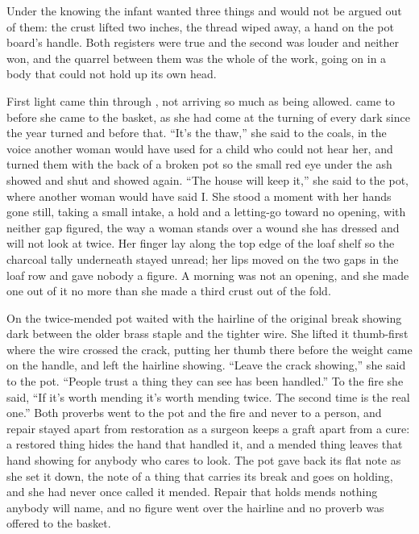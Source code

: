 Under the knowing the infant wanted three things and would not be argued out of them: the crust lifted two inches, the thread wiped away, a hand on the pot board's handle. Both registers were true and the second was louder and neither won, and the quarrel between them was the whole of the work, going on in a body that could not hold up its own head.

First light came thin through , not arriving so much as being allowed.  came to  before she came to the basket, as she had come at the turning of every dark since the year turned and before that. “It's the thaw,” she said to the coals, in the voice another woman would have used for a child who could not hear her, and turned them with the back of a broken pot so the small red eye under the ash showed and shut and showed again. “The house will keep it,” she said to the pot, where another woman would have said I. She stood a moment with her hands gone still, taking a small intake, a hold and a letting-go toward no opening, with neither gap figured, the way a woman stands over a wound she has dressed and will not look at twice. Her finger lay along the top edge of the loaf shelf so the charcoal tally underneath stayed unread; her lips moved on the two gaps in the loaf row and gave nobody a figure. A morning was not an opening, and she made one out of it no more than she made a third crust out of the fold.

On  the twice-mended pot waited with the hairline of the original break showing dark between the older brass staple and the tighter wire. She lifted it thumb-first where the wire crossed the crack, putting her thumb there before the weight came on the handle, and left the hairline showing. “Leave the crack showing,” she said to the pot. “People trust a thing they can see has been handled.” To the fire she said, “If it's worth mending it's worth mending twice. The second time is the real one.” Both proverbs went to the pot and the fire and never to a person, and repair stayed apart from restoration as a surgeon keeps a graft apart from a cure: a restored thing hides the hand that handled it, and a mended thing leaves that hand showing for anybody who cares to look. The pot gave back its flat note as she set it down, the note of a thing that carries its break and goes on holding, and she had never once called it mended. Repair that holds mends nothing anybody will name, and no figure went over the hairline and no proverb was offered to the basket.


